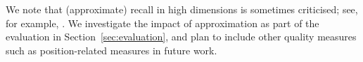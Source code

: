 We note that (approximate) recall in high dimensions is sometimes criticised; see, for example, \cite[Section 2.1]{nmslib}. We investigate the impact of approximation as part of the evaluation in Section~\ref{sec:evaluation}, and plan to include other quality measures such as position-related measures \cite{ZezulaSAR98} in future work. 

\begin{comment}
Given a query point $q \in X$ and the tuple $\pi^\ast$ of true nearest neighbors, we let $d_1 < \dots < d_t$ denote the $t \leq k$ distinct distances of the points in $\pi^\ast$ to 
$q$. Let $f_i$ be the number of points in $\pi$ that have distance $d_i$ to $q$, and let $f'_t$ be the number of points in $\pi^\ast$ at distance $d_t$.  We define: 
\begin{align*}
    \text{recall}(\pi, \pi^\ast) &= \frac{\sum_{i = 1}^{t - 1} f_i + \min\{f_t, f'_t\}}{k}.
\end{align*}
Note the minimum for the last class of distances. Otherwise, the recall of a result with two points at distance $2$, where the true nearest neighbors have distance $1$ and $2$ would yield a recall of $1$.

For an approximation factor $\varepsilon > 0$ we define an approximative version of recall as follows: We say that a point $p$ is \emph{$\varepsilon$-close} to $d_i$ if dist$(p, q) \leq (1+\varepsilon)d_i$ but dist$(p,q) > (1+\varepsilon)d_{i - 1}$. (For sake of the definition, we set $d_0 = -1$.) Now, we let $f^\varepsilon_i$ be the number of points in $\pi$ that 
are $\varepsilon$-close to $d_i$, for each $i \in \{1,\ldots, t\}$.  Furthermore, let $f'_t$ be defined as above. Then we define  

\begin{align*}
\text{recall}_\varepsilon(\pi, \pi^\ast) &= \frac{\sum_{i = 1}^{t - 1} f^\varepsilon_i + \min\{f^\varepsilon_t, f'_t\}}{k}.
\end{align*}

To estimate the quality of the result without having an approximation factor $\varepsilon$, \cite{ZezulaSAR98} propose to look at the \emph{relative error}
of $\pi$ and $\pi^\ast$.
\begin{align*}
\text{rel-error}(\pi, \pi^\ast) &=
\begin{cases}
\frac{\sum_{i = 1}^{k}\text{dist}(q, p^\ast_i)}{\sum_{i = 1}^{k}\text{dist}(q, p_i)}, & \text{if $k = k'$, and} \\
0, & \text{otherwise}.
\end{cases}
\end{align*}
%
Here, we set the relative distance of a result having less than $k$ elements to $0$, which corresponds to filling up the left-out spots by points at distance $\infty$ to the query.

We note that recall and relative error are up to criticism in high dimensions, see, for example the discussion in~\cite[Section 2.1]{nmslib}. In our experiments, we did not observe that approximative recall or relative error yielded unexpected results. Nevertheless, we plan to include other quality measures such as position-related measures \cite{ZezulaSAR98} in future work. 
\end{comment}
